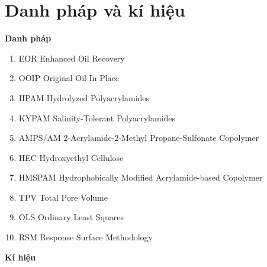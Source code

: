 \documentclass[12pt,a4paper]{article}
\begin{document}
\section*{\textbf{\LARGE Danh pháp và kí hiệu}}
\hspace*{1cm}\textbf{Danh pháp}
	\begin{enumerate}
		\item[] EOR \hspace*{50pt} Enhanced Oil Recovery
		\item[] OOIP \hspace*{45pt} Original Oil In Place
		\item[] HPAM \hspace*{39pt} Hydrolyzed Polyacrylamides
		\item[] KYPAM \hspace*{29pt} Salinity-Tolerant Polyacrylamides
		\item[] AMPS/AM \hspace*{15pt} 2-Acrylamide-2-Methyl Propane-Sulfonate Copolymer
		\item[] HEC \hspace*{47pt} Hydroxyethyl Cellulose
		\item[] HMSPAM \hspace*{19pt} Hydrophobically Modified Acrylamide-based Copolymer
		\item[] TPV \hspace*{47pt} Total Pore Volume
		\item[] OLS \hspace*{47pt} Ordinary Least Squares
		\item[] RSM \hspace*{44pt} Response Surface Methodology
	\end{enumerate}
	\newpage
	\noindent
\hspace*{1cm}\textbf{Kí hiệu}
\end{document}
